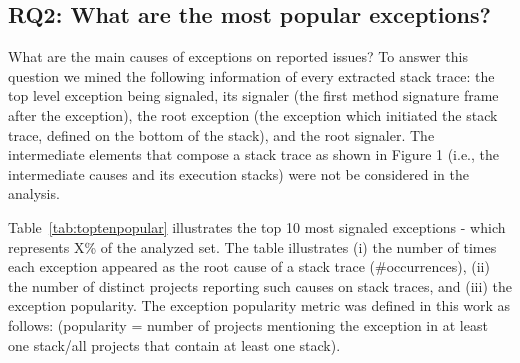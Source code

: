 \documentclass[conference]{IEEEtran}
\begin{document}
\noindent {}



    





\subsection{RQ2: What are the most popular exceptions?}

What are the main causes of exceptions on reported issues? To answer this question we mined the following information of every extracted stack trace: the top level exception being signaled, its signaler (the first method signature frame after the exception), the root exception (the exception which initiated the stack trace, defined on the bottom of the stack), and the root signaler. The intermediate elements that compose a stack trace as shown in Figure 1 (i.e., the intermediate causes and its execution stacks) were not be considered in the analysis.

Table~\ref{tab:toptenpopular} illustrates the top 10 most signaled exceptions - which represents X\% of the analyzed set. The table illustrates  (i) the number of times each exception appeared as the root cause of a stack trace (\#occurrences), (ii) the number of distinct projects reporting such causes on stack traces, and (iii) the exception popularity. The exception popularity metric was defined in this work as follows: (popularity = number of projects mentioning the exception in at least one stack/all projects that contain at least one stack).
\end{document}
